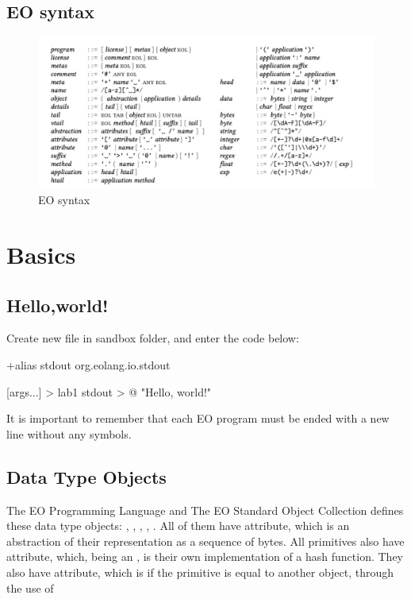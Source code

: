 \documentclass[12pt]{book}
\begin{document}
\section{EO syntax}
\begin{figure}[h]
  \centering
  \includegraphics[width=1\textwidth,]{EOsyntxax.jpg}
  \caption{EO syntax}
  \label{fig:uml1}
\end{figure}


\chapter{Basics}

\section{Hello,world!}
Create new file  in sandbox folder, and enter the code below:

\begin{ffcode}
+alias stdout org.eolang.io.stdout

[args...] > lab1
  stdout > @
    "Hello, world!"
\end{ffcode}

It is important to remember that each EO program must be ended with a new line without any symbols.


\section{Data Type Objects}

The EO Programming Language and The EO Standard Object Collection defines these data type objects: , , , , . All of them have  attribute, which is an abstraction of their representation as a sequence of bytes.
All primitives also have  attribute, which, being an , is their own implementation of a hash function. They also have  attribute, which is  if the primitive is equal to another object, through the use of 
\end{document}
